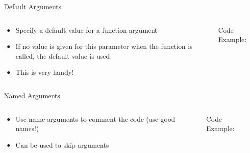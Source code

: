 % 
% 
% 
\begin{Slide}{Default Arguments}
 \begin{columns}
    \begin{column}{.48\textwidth}
      
      \begin{itemize}
      \item Specify a default value for a function argument 
\item If no value is given for this parameter when the function is called, the default value is used
\item This is very handy!
     
      \end{itemize}
      
      
    \end{column}

    \hfill

    \begin{column}{.48\textwidth}
\pause
      Code Example:
      
      \inputminted[firstline=3,
      lastline=23,
      breaklines,
      fontsize=\tiny,
      bgcolor=Background,
      linenos]{python}{../src/functions.py}

      
      
    \end{column}
  \end{columns}

\end{Slide}

% 
% 
% 
\begin{Slide}{Named Arguments}
  \begin{columns}
    \begin{column}{.48\textwidth}
      
      \begin{itemize}
      \item Use name arguments to comment the code (use good names!)
      \item Can be used to skip arguments
      \end{itemize}
      
      
    \end{column}

    \hfill

    \begin{column}{.48\textwidth}
\pause
      Code Example:
            
   \inputminted[firstline=3,
      lastline=27,
      breaklines,
      fontsize=\tiny,
      bgcolor=Background,
      linenos]{python}{../src/functions.py}
      
      
    \end{column}
  \end{columns}


\end{Slide}

